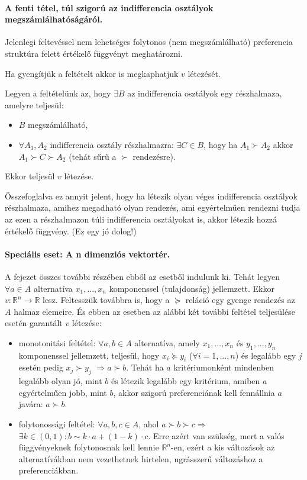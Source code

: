 \documentclass[a4paper,12pt]{article}
\begin{document}
\paragraph{A fenti tétel, túl szigorú az indifferencia osztályok megszámlálhatóságáról.}

Jelenlegi feltevéssel nem lehetséges folytonos (nem megszámlálható) preferencia struktúra felett értékelő függvényt meghatározni. 

Ha gyengítjük a feltételt akkor is megkaphatjuk $v$ létezését.

Legyen a feltételünk az, hogy $\exists B$ az indifferencia osztályok egy részhalmaza, amelyre teljesül:
\begin{itemize}
\item $B$ megszámlálható,
\item $\forall A_1, A_2$ indifferencia osztály részhalmazra: $\exists C \in B$, hogy ha $A_1 \succ A_2$ akkor $A_1 \succ C \succ A_2$ (tehát sűrű a $\succ$ rendezésre). 
\end{itemize}
Ekkor teljesül $v$ létezése. 

Összefoglalva ez annyit jelent, hogy ha létezik olyan véges indifferencia osztályok részhalmaza, amihez megadható olyan rendezés, ami egyértelműen rendezni tudja az ezen a részhalmazon túli indifferencia osztályokat is, akkor létezik hozzá értékelő függvény. (Ez egy jó dolog!)

\paragraph{Speciális eset: A n dimenziós vektortér. }

A fejezet összes további részében ebből az esetből indulunk ki.
Tehát legyen $\forall a \in A$ alternatíva $x_1, ... , x_n$ komponenssel (tulajdonság) jellemzett.
Ekkor $v: \mathbb{R}^n \rightarrow \mathbb{R}$ lesz.
Feltesszük továbbra is, hogy a $\succeq$ reláció egy gyenge rendezés az $A$ halmaz elemeire.
És ebben az esetben az alábbi két további feltétel teljesülése esetén garantált $v$ létezése:
\begin{itemize}
\item monotonitási feltétel:
$\forall a,b \in A$ alternatíva, amely $x_1, ... , x_n$ és $y_1, ... , y_n$ komponenssel jellemzett,
teljesül, hogy $x_i \succeq y_i$ ($\forall i = 1, ... , n$) és legalább egy $j$ esetén pedig
$x_j \succ y_j$ $\Rightarrow a \succ b$.
Tehát ha $a$ kritériumonként mindenben legalább olyan jó,
mint $b$ és létezik legalább egy kritérium, amiben $a$ egyértelműen jobb, mint $b$,
akkor szigorú preferenciának kell fennállnia $a$ javára: $a \succ b$.
\item folytonossági feltétel: $\forall a,b,c \in A$, ahol $a \succ b \succ c \Rightarrow$  $\exists k \in (0,1): b \sim k \cdot a + (1-k) \cdot c$.
Erre azért van szükség, mert a valós függvényeknek folytonosnak kell lennie $\mathbb{R}^n$-en, ezért a kis változások az
alternatívákban nem vezethetnek hirtelen, ugrásszerű változáshoz a preferenciákban.
\end{itemize}
\end{document}
